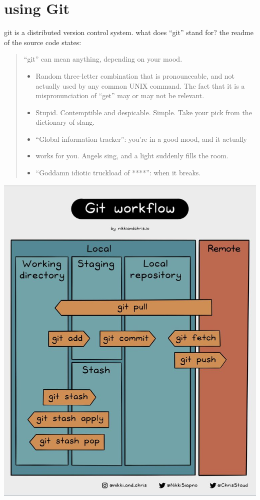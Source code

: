 \documentclass[
]{article}
\providecommand{\tightlist}{%
  \setlength{\itemsep}{0pt}\setlength{\parskip}{0pt}}
\begin{document}
\hypertarget{using-git}{%
\section{using Git}\label{using-git}}

git is a distributed version control system. what does ``git'' stand
for? the readme of the source code states:

\begin{quote}
``git'' can mean anything, depending on your mood.

\begin{itemize}
\tightlist
\item
  Random three-letter combination that is pronounceable, and not
  actually used by any common UNIX command. The fact that it is a
  mispronunciation of ``get'' may or may not be relevant.
\item
  Stupid. Contemptible and despicable. Simple. Take your pick from the
  dictionary of slang.
\item
  ``Global information tracker'': you're in a good mood, and it actually
\item
  works for you. Angels sing, and a light suddenly fills the room.
\item
  ``Goddamn idiotic truckload of ****'': when it breaks.
\end{itemize}
\end{quote}

\includegraphics{images/git-flow.png}
\end{document}
